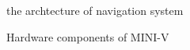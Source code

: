 \documentclass[lettersize,journal]{IEEEtran}
\begin{document}
\begin{figure}[t]
  \begin{center}
  \end{center}
  \caption{the archtecture of navigation system}
  \label{fig:arch_nav}
\end{figure}

\begin{figure}[t]
    \begin{center}
  \end{center}
  \caption{Hardware components of MINI-V}
  \label{fig:mini_v_component}
\end{figure}
\end{document}
